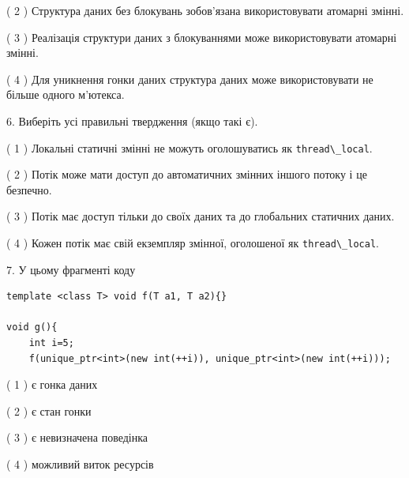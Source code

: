 \documentclass[12pt, ukrainian]{article}
\def\code#1{\Verb!#1!}
\begin{document}
\begin {large}
{( 2 ) Структура даних без блокувань зобов’язана використовувати атомарні змінні.%

( 3 ) Реалізація структури даних з блокуваннями може використовувати атомарні змінні.%

( 4 ) Для уникнення гонки даних структура даних може використовувати не більше одного м’ютекса.%
\newpage



\vspace{5mm}
6. Виберіть усі правильні твердження (якщо такі є).\par
\vspace{2mm}

( 1 ) Локальні статичні змінні не можуть оголошуватись як \code{thread\_local}.%

( 2 ) Потік може мати доступ до автоматичних змінних іншого потоку і це безпечно.%

( 3 ) Потік має доступ тільки до своїх даних та до глобальних статичних даних.%

( 4 ) Кожен потік має свій екземпляр змінної, оголошеної як \code{thread\_local}.%


\vspace{5mm}
7. У цьому фрагменті коду
\begin{verbatim}
template <class T> void f(T a1, T a2){}

void g(){
    int i=5;
    f(unique_ptr<int>(new int(++i)), unique_ptr<int>(new int(++i)));
\end{verbatim}

( 1 ) є гонка даних%

( 2 ) є стан гонки%

( 3 ) є невизначена поведінка%

( 4 ) можливий виток ресурсів%
}
\end {large}
\end{document}
